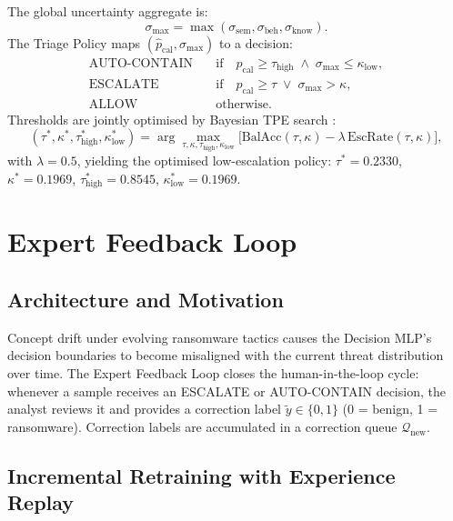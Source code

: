 The global uncertainty aggregate is:
\begin{equation}
\sigma_\text{max} = \max(\sigma_\text{sem}, \sigma_\text{beh}, \sigma_\text{know}).
\label{eq:tifs_sigmamax}
\end{equation}
The Triage Policy maps $(\hat{p}_\text{cal}, \sigma_\text{max})$ to a decision:
\begin{align}
\text{AUTO-CONTAIN} &\quad \text{if} \quad \hat{p}_\text{cal} \geq \tau_\text{high} \;\wedge\; \sigma_\text{max} \leq \kappa_\text{low}, \label{eq:tifs_auto} \\
\text{ESCALATE}     &\quad \text{if} \quad \hat{p}_\text{cal} \geq \tau \;\vee\; \sigma_\text{max} > \kappa, \label{eq:tifs_esc} \\
\text{ALLOW}        &\quad \text{otherwise.} \label{eq:tifs_allow}
\end{align}
Thresholds are jointly optimised by Bayesian TPE search \cite{optuna2019}:
\begin{equation}
(\tau^*, \kappa^*, \tau_\text{high}^*, \kappa_\text{low}^*) = \arg\max_{\tau, \kappa, \tau_\text{high}, \kappa_\text{low}} \bigl[\text{BalAcc}(\tau, \kappa) - \lambda\,\text{EscRate}(\tau, \kappa)\bigr],
\label{eq:tifs_objective}
\end{equation}
with $\lambda = 0.5$, yielding the optimised low-escalation policy: $\tau^* = 0.2330$, $\kappa^* = 0.1969$, $\tau_\text{high}^* = 0.8545$, $\kappa_\text{low}^* = 0.1969$.


\section{Expert Feedback Loop}
\label{sec:tifs_feedback}

\subsection{Architecture and Motivation}

Concept drift under evolving ransomware tactics causes the Decision MLP's decision boundaries to become misaligned with the current threat distribution over time. The Expert Feedback Loop closes the human-in-the-loop cycle: whenever a sample receives an ESCALATE or AUTO-CONTAIN decision, the analyst reviews it and provides a correction label $\tilde{y} \in \{0, 1\}$ (0 = benign, 1 = ransomware). Correction labels are accumulated in a correction queue $\mathcal{Q}_\text{new}$.

\subsection{Incremental Retraining with Experience Replay}

